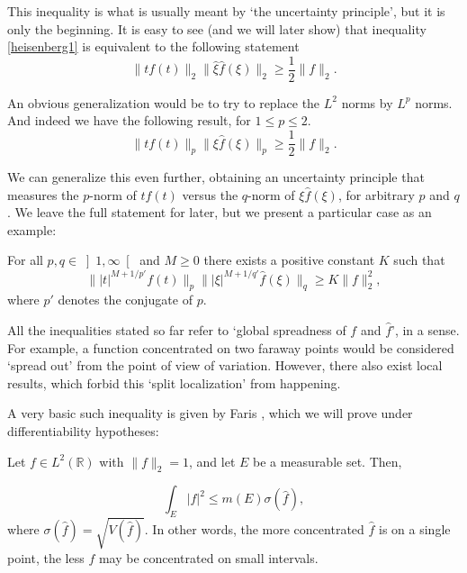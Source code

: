 \documentclass{amsart}
\newcommand{\R}{\mathbb{R}}
\begin{document}
This inequality is what is usually meant by `the uncertainty principle', but it is only the beginning. It is easy to see (and we will later show) that inequality \eqref{heisenberg1} is equivalent to the following statement
\begin{equation}\label{heisenberg2}
\lVert t f(t) \rVert_2 \lVert \hat \xi \hat f(\xi) \rVert_2 \geq \frac12 \lVert f \rVert_2.
\end{equation}

An obvious generalization would be to try to replace the $L^2$ norms by $L^p$ norms. And indeed we have the following result, for $1 \leq p \leq 2$.
\begin{equation}\label{heisenberg3}
\lVert t f(t) \rVert_p \lVert \xi \hat f(\xi) \rVert_p \geq \frac12 \lVert f \rVert_2.
\end{equation}

We can generalize this even further, obtaining an uncertainty principle that measures the $p$-norm of $t f(t)$ versus the $q$-norm of $\xi \hat f(\xi)$, for arbitrary $p$ and $q$. We leave the full statement for later, but we present a particular case as an example:

For all $p, q \in \left]1, \infty\right[$ and $M \geq 0$ there exists a positive constant $K$ such that
\begin{equation}\label{heisenberg4}
\lVert \lvert t \rvert^{M + 1/p'} f(t) \rVert_p \lVert \lvert \xi \rvert^{M + 1/q'} \hat f(\xi) \rVert_q \geq K \lVert f \rVert_2^2,
\end{equation}
where $p'$ denotes the conjugate of $p$.

\bigskip

All the inequalities stated so far refer to `global spreadness of $f$ and $\hat f$', in a sense. For example, a function concentrated on two faraway points would be considered `spread out' from the point of view of variation. However, there also exist local results, which forbid this `split localization' from happening.

A very basic such inequality is given by Faris \cite{faris}, which we will prove under differentiability hypotheses:

Let $f \in L^2(\R)$ with $\lVert f \rVert_2 = 1$, and let $E$ be a measurable set. Then,

\[\int_E \lvert f \rvert^2 \leq m(E) \sigma(\hat f),\]
where $\sigma(\hat f) = \sqrt{V(\hat f)}$. In other words, the more concentrated $\hat f$ is on a single point, the less $f$ may be concentrated on small intervals.
\end{document}
